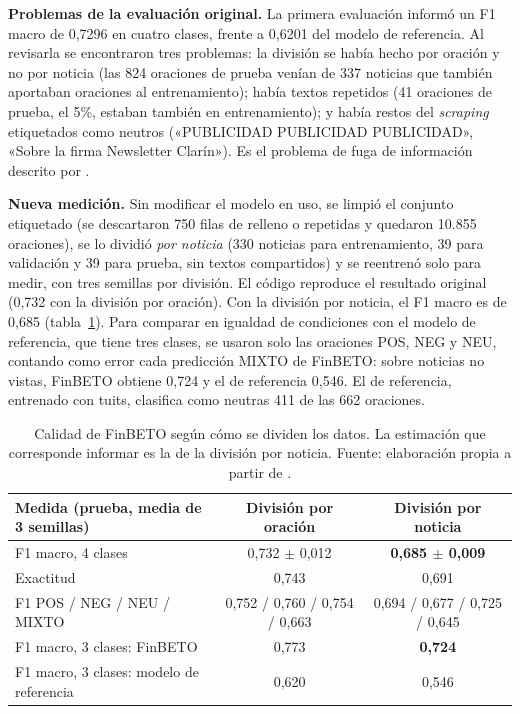 \textbf{Problemas de la evaluación original.} La primera evaluación informó un F1 macro de
0,7296 en cuatro clases, frente a 0,6201 del modelo de referencia. Al revisarla se encontraron
tres problemas: la división se había hecho por oración y no por noticia (las 824 oraciones de
prueba venían de 337 noticias que también aportaban oraciones al entrenamiento); había textos
repetidos (41 oraciones de prueba, el 5\%, estaban también en entrenamiento); y había restos
del \textit{scraping} etiquetados como neutros («PUBLICIDAD PUBLICIDAD PUBLICIDAD», «Sobre la
firma Newsletter Clarín»). Es el problema de fuga de información descrito por
\citet{kapoor2023leakage}.

\textbf{Nueva medición.} Sin modificar el modelo en uso, se limpió el conjunto etiquetado (se
descartaron 750 filas de relleno o repetidas y quedaron 10.855 oraciones), se lo dividió
\textit{por noticia} (330 noticias para entrenamiento, 39 para validación y 39 para prueba,
sin textos compartidos) y se reentrenó solo para medir, con tres semillas por división. El
código reproduce el resultado original (0,732 con la división por oración). Con la división por
noticia, el F1 macro es de 0,685 (tabla~\ref{tab:finbeto}). Para comparar en igualdad de
condiciones con el modelo de referencia, que tiene tres clases, se usaron solo las oraciones
POS, NEG y NEU, contando como error cada predicción MIXTO de FinBETO: sobre noticias no vistas,
FinBETO obtiene 0,724 y el de referencia 0,546. El de referencia, entrenado con tuits, clasifica
como neutras 411 de las 662 oraciones.

\begin{table}[H]
\centering\footnotesize
\begin{tabular}{@{}lcc@{}}
\toprule
\textbf{Medida (prueba, media de 3 semillas)} & \textbf{División por oración} & \textbf{División por noticia} \\
\midrule
F1 macro, 4 clases & 0,732 $\pm$ 0,012 & \textbf{0,685 $\pm$ 0,009} \\
Exactitud & 0,743 & 0,691 \\
F1 POS / NEG / NEU / MIXTO & 0,752 / 0,760 / 0,754 / 0,663 & 0,694 / 0,677 / 0,725 / 0,645 \\
\midrule
F1 macro, 3 clases: FinBETO & 0,773 & \textbf{0,724} \\
F1 macro, 3 clases: modelo de referencia & 0,620 & 0,546 \\
\bottomrule
\end{tabular}
\caption{Calidad de FinBETO según cómo se dividen los datos. La estimación que corresponde
informar es la de la división por noticia. Fuente: elaboración propia a partir de
.}
\label{tab:finbeto}
\end{table}

